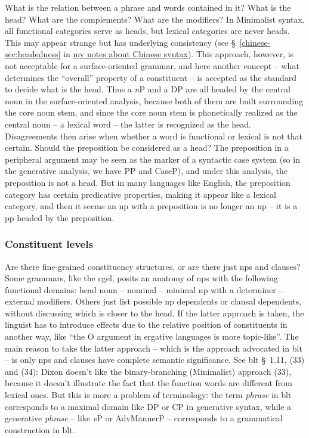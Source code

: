 \documentclass[UTF8, a4paper, oneside, scheme=plain]{ctexart}
\newcommand*{\citesec}[1]{\S~{#1}}
\newcommand*{\term}[1]{\emph{#1}}
\newcommand{\chinesenote}{\href{../Chinese/main.pdf}{my notes about Chinese syntax}}
\begin{document}
What is the relation between a phrase and words contained in it?
What is the head? What are the complements? What are the modifiers?
In Minimalist syntax, all functional categories serve as heads,
but lexical categories are never heads.
This may appear strange but has underlying consistency 
(see \citesec{\ref{chinese-sec:headedness}} in \chinesenote).
This approach, however, is not acceptable for a surface-oriented grammar,
and here another concept -- what determines the ``overall'' property of a constituent -- 
is accepted as the standard to decide what is the head. 
Thus a \term{n}P and a DP are all headed by the central noun in the surface-oriented analysis,
because both of them are built surrounding the core noun stem,
and since the core noun stem is phonetically realized as the central noun -- a lexical word --
the latter is recognized as the head.
Disagreements then arise when whether a word is functional or lexical is not that certain.
Should the preposition be considered as a head? 
The preposition in a peripheral argument may be seen as the marker of a syntactic case system 
(so in the generative analysis, we have PP and CaseP),
and under this analysis, the preposition is not a head.
But in many languages like English, 
the preposition category has certain predicative properties,
making it appear like a lexical category, 
and then it seems an \ac{np} with a preposition is no longer an \ac{np} -- 
it is a \ac{pp} headed by the preposition.

\subsubsection{Constituent levels}

Are there fine-grained constituency structures, or are there just \acl{np}s and clauses?
Some grammars, like the \ac{cgel}, 
posits an anatomy of \ac{np}s with the following functional domains:
head noun -- nominal -- minimal \ac{np} with a determiner -- external modifiers.
Others just list possible \ac{np} dependents or clausal dependents,
without discussing which is closer to the head. 
If the latter approach is taken,
the linguist has to introduce effects due to the relative position of constituents in another way,
like ``the O argument in ergative languages is more topic-like''.
The main reason to take the latter approach -- which is the approach advocated in \ac{blt} --
is only \ac{np}s and clauses have complete semantic significance.
See \ac{blt} \citesec{1.11}, (33) and (34):
Dixon doesn't like the binary-branching (Minimalist) approach (33),
because it doesn't illustrate the fact that the function words are different from lexical ones. 
But this is more a problem of terminology:
the term \term{phrase} in \ac{blt} corresponds to a maximal domain like DP or CP in generative syntax,
while a generative \term{phrase} -- like \term{v}P or AdvMannerP -- 
corresponds to a grammatical construction in \ac{blt}.
\end{document}
